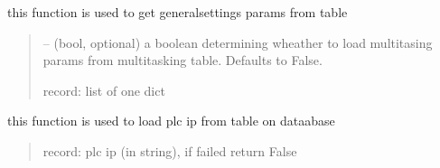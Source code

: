 \documentclass[letterpaper,10pt,english]{sphinxmanual}
\begin{document}
\begin{savenotes}
\begin{fulllineitems}
\begin{savenotes}
\begin{fulllineitems}
\end{fulllineitems}\end{savenotes}


\begin{savenotes}\begin{fulllineitems}
\label{\detokenize{setting/database_utils:oxin.database_utils.dataBaseUtils.load_general_setting_params}}
\pysigstartsignatures
{}
\pysigstopsignatures
\sphinxAtStartPar
this function is used to get general\sphinxhyphen{}settings params from table
\begin{quote}\begin{description}
\sphinxAtStartPar
{} – (bool, optional) a boolean determining wheather to load multitasing params from multitasking table. Defaults to False.

\sphinxAtStartPar
record: list of one dict

\end{description}\end{quote}

\end{fulllineitems}\end{savenotes}


\begin{savenotes}\begin{fulllineitems}
\label{\detokenize{setting/database_utils:oxin.database_utils.dataBaseUtils.load_plc_ip}}
\pysigstartsignatures
{}
\pysigstopsignatures
\sphinxAtStartPar
this function is used to load plc ip from table on dataabase
\begin{quote}\begin{description}
\sphinxAtStartPar
record: plc ip (in string), if failed return False

\end{description}\end{quote}


\end{fulllineitems}
\end{savenotes}
\end{fulllineitems}
\end{savenotes}
\end{document}
